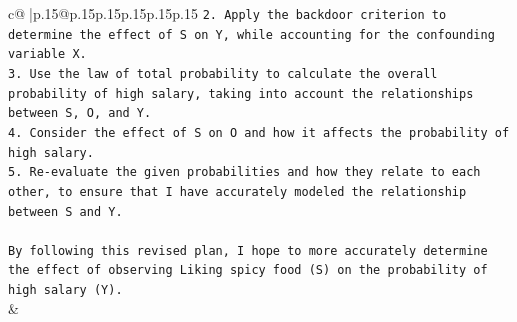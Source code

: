 \documentclass{article}
\begin{document}
{\begin{supertabular}{c@{$\;$}|p{.15\linewidth}@{}p{.15\linewidth}p{.15\linewidth}p{.15\linewidth}p{.15\linewidth}p{.15\linewidth}}
{{{\texttt{2. Apply the backdoor criterion to determine the effect of S on Y, while accounting for the confounding variable X.} \\
\texttt{3. Use the law of total probability to calculate the overall probability of high salary, taking into account the relationships between S, O, and Y.} \\
\texttt{4. Consider the effect of S on O and how it affects the probability of high salary.} \\
\texttt{5. Re{-}evaluate the given probabilities and how they relate to each other, to ensure that I have accurately modeled the relationship between S and Y.} \\
\\ 
\texttt{By following this revised plan, I hope to more accurately determine the effect of observing Liking spicy food (S) on the probability of high salary (Y).} \\
            }
        }
    }
    & \\ \\

\end{supertabular}
}
\end{document}
